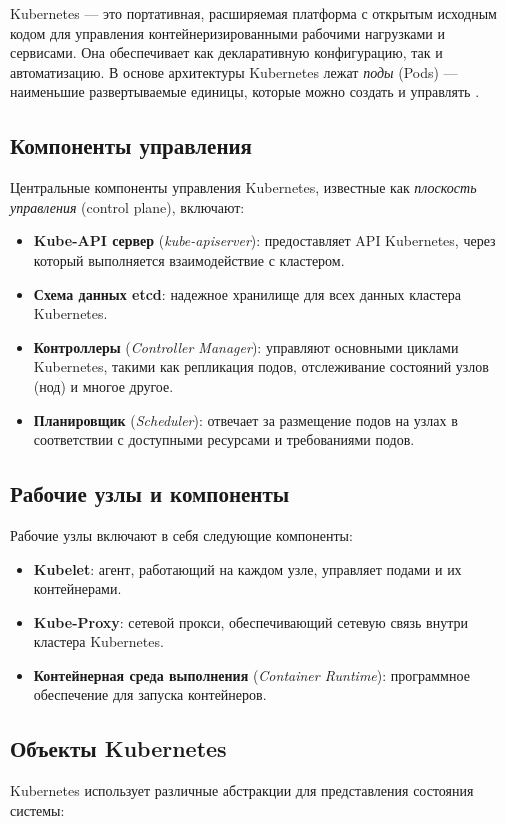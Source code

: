 Kubernetes — это портативная, расширяемая платформа с открытым исходным кодом
для управления контейнеризированными рабочими нагрузками и сервисами. Она
обеспечивает как декларативную конфигурацию, так и автоматизацию. В основе
архитектуры Kubernetes лежат \textit{поды} (Pods)  — наименьшие развертываемые
единицы,
которые можно создать и управлять \cite{nocentino2021kubernetes}.

\subsection*{Компоненты управления}
Центральные компоненты управления Kubernetes, известные как \textit{плоскость
управления}
(control plane), включают:

\begin{itemize}
   \item \textbf{Kube-API сервер} (\textit{kube-apiserver}): предоставляет API
Kubernetes, через который выполняется взаимодействие с кластером.
   \item \textbf{Схема данных etcd}: надежное хранилище для всех данных
кластера Kubernetes.
   \item \textbf{Контроллеры} (\textit{Controller Manager}): управляют
основными циклами Kubernetes, такими как репликация подов, отслеживание
состояний узлов (нод) и многое другое.
   \item \textbf{Планировщик} (\textit{Scheduler}): отвечает за размещение
подов на узлах в соответствии с доступными ресурсами и требованиями подов.
\end{itemize}

\subsection*{Рабочие узлы и компоненты}
Рабочие узлы включают в себя следующие компоненты:

\begin{itemize}
   \item \textbf{Kubelet}: агент, работающий на каждом узле, управляет подами и
их контейнерами.
   \item \textbf{Kube-Proxy}: сетевой прокси, обеспечивающий сетевую связь
внутри кластера Kubernetes.
   \item \textbf{Контейнерная среда выполнения} (\textit{Container Runtime}):
программное обеспечение для запуска контейнеров.
\end{itemize}

\subsection*{Объекты Kubernetes}
Kubernetes использует различные абстракции для представления состояния системы:

